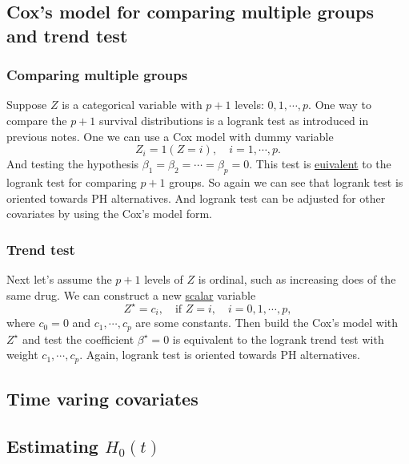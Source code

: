 \documentclass[a4paper,12pt]{article}
\begin{document}
\subsection{Cox's model for comparing multiple groups and trend test}
\label{sec:coxs-model-comparing}

\subsubsection{Comparing multiple groups}
\label{sec:comp-mult-groups}

Suppose $Z$ is a categorical variable with $p + 1$ levels: $0, 1, \cdots, p$. One way to compare the $p+1$ survival distributions is a logrank test as introduced in previous notes. One we can use a Cox model with dummy variable
\[
  Z_i = 1\left(Z = i\right), \quad i = 1, \cdots, p.
\]
And testing the hypothesis $\beta_1 = \beta_2 = \cdots = \beta_p = 0$. This test is \underline{euivalent} to the logrank test for comparing $p + 1$ groups. So again we can see that logrank test is oriented towards PH alternatives. And logrank test can be adjusted for other covariates by using the Cox's model form.
\par

\subsubsection{Trend test}
\label{sec:trend-test}

Next let's assume the $p + 1$ levels of $Z$ is ordinal, such as increasing does of the same drug. We can construct a new \underline{scalar} variable
\[
  Z^\star = c_i
  ,\quad \text{if }Z = i
  ,\quad i = 0, 1, \cdots, p
  ,
\]
where $c_0 = 0$ and $c_1, \cdots, c_p$ are some constants. Then build the Cox's model with $Z^\star$ and test the coefficient $\beta^\star = 0$ is equivalent to the logrank trend test with weight $c_1, \cdots, c_p$. Again, logrank test is oriented towards PH alternatives.

\subsection{Time varing covariates}
\label{sec:time-varing-covar}


\subsection{Estimating $H_0\left(t\right)$}
\label{sec:estim-h_0l}









\end{document}

